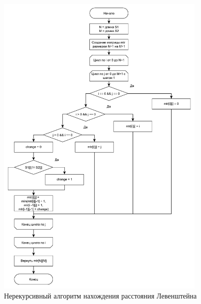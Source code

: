 \begin{figure}
	\centering
	\includegraphics[width=0.9\textwidth]{img/lev2.pdf} %
	\caption{Нерекурсивный алгоритм нахождения расстояния Левенштейна}
	\label{fig:lev}
\end{figure}

